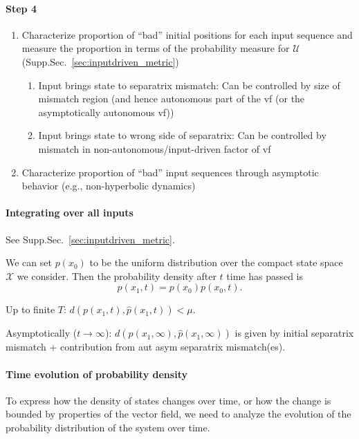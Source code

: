 \documentclass{article}
\theoremstyle{definition} \newtheorem{definition}{Definition}
\theoremstyle{remark} \newtheorem{remark}{Remark}
\newcounter{ct}
\begin{document}
\paragraph{Step 4}
\begin{enumerate}
\item Characterize proportion of “bad” initial positions for each input sequence and measure the proportion in terms of the probability measure for $\mathcal{U}$ (Supp.Sec.~\ref{sec:inputdriven_metric})
\begin{enumerate}
\item Input brings state to separatrix mismatch: 
	Can be controlled by size of mismatch region (and hence autonomous part of the vf (or the asymptotically autonomous vf))
\item  Input brings state to wrong side of separatrix:
 	Can be controlled by mismatch in non-autonomous/input-driven factor of vf
\end{enumerate}
\item Characterize proportion of “bad” input sequences through asymptotic behavior (e.g., non-hyperbolic dynamics)
\end{enumerate}


\paragraph{Integrating over all inputs}
See Supp.Sec.~\ref{sec:inputdriven_metric}.

We can set $p(x_0)$ to be the uniform distribution over the compact state space $\mathcal{X}$ we consider. 
Then the probability density after $t$ time has passed is
\begin{equation}\label{eq:init_path_density}
p(x_1,t) = p(x_0)p(x_0,t).
\end{equation}



Up to finite $T$: $d(p(x_1,t),\hat p(x_1,t))<\mu$. %

Asymptotically ($t\rightarrow\infty$): $d(p(x_1,\infty),\hat p(x_1,\infty))$ is given by initial separatrix mismatch + contribution from aut asym separatrix mismatch(es).

\paragraph{Time evolution of probability density}
To express how the density of states changes over time, or how the change is bounded by properties of the vector field, we need to analyze the evolution of the probability distribution of the system over time.
\end{document}
